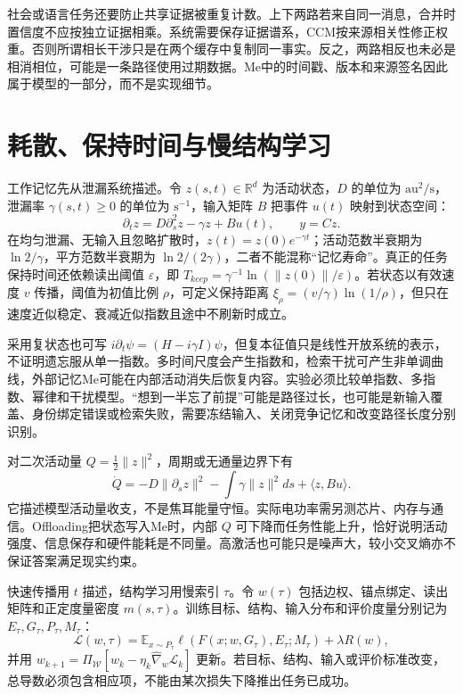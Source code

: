 社会或语言任务还要防止共享证据被重复计数。上下两路若来自同一消息，合并时置信度不应按独立证据相乘。系统需要保存证据谱系，CCM按来源相关性修正权重。否则所谓相长干涉只是在两个缓存中复制同一事实。反之，两路相反也未必是相消相位，可能是一条路径使用过期数据。Me中的时间戳、版本和来源签名因此属于模型的一部分，而不是实现细节。

\section{耗散、保持时间与慢结构学习}
\label{sec:dissipation_complex_spectrum}
\label{sec:dissipative_heat_and_plastic_collapse}

工作记忆先从泄漏系统描述。令 $z(s,t)\in\mathbb R^d$ 为活动状态，$D$ 的单位为 $\mathrm{au}^2/\mathrm{s}$，泄漏率 $\gamma(s,t)\ge0$ 的单位为 $\mathrm{s}^{-1}$，输入矩阵 $B$ 把事件 $u(t)$ 映射到状态空间：
\begin{equation}
 \partial_tz=D\partial_s^2z-\gamma z+Bu(t),\qquad y=Cz .
\end{equation}
在均匀泄漏、无输入且忽略扩散时，$z(t)=z(0)e^{-\gamma t}$；活动范数半衰期为 $\ln2/\gamma$，平方范数半衰期为 $\ln2/(2\gamma)$，二者不能混称“记忆寿命”。真正的任务保持时间还依赖读出阈值 $\varepsilon$，即 $T_{keep}=\gamma^{-1}\ln(\|z(0)\|/\varepsilon)$。若状态以有效速度 $v$ 传播，阈值为初值比例 $\rho$，可定义保持距离 $\xi_\rho=(v/\gamma)\ln(1/\rho)$，但只在速度近似稳定、衰减近似指数且途中不刷新时成立。

采用复状态也可写 $i\partial_t\psi=(H-i\gamma I)\psi$，但复本征值只是线性开放系统的表示，不证明遗忘服从单一指数。多时间尺度会产生指数和，检索干扰可产生非单调曲线，外部记忆Me可能在内部活动消失后恢复内容。实验必须比较单指数、多指数、幂律和干扰模型。“想到一半忘了前提”可能是路径过长，也可能是新输入覆盖、身份绑定错误或检索失败，需要冻结输入、关闭竞争记忆和改变路径长度分别识别。

对二次活动量 $Q=\tfrac12\|z\|^2$，周期或无通量边界下有
\begin{equation}
 \dot Q=-D\|\partial_sz\|^2-\int\gamma\|z\|^2ds+\langle z,Bu\rangle .
\end{equation}
它描述模型活动量收支，不是焦耳能量守恒。实际电功率需另测芯片、内存与通信。Offloading把状态写入Me时，内部 $Q$ 可下降而任务性能上升，恰好说明活动强度、信息保存和硬件能耗是不同量。高激活也可能只是噪声大，较小交叉熵亦不保证答案满足现实约束。

快速传播用 $t$ 描述，结构学习用慢索引 $\tau$。令 $w(\tau)$ 包括边权、锚点绑定、读出矩阵和正定度量密度 $m(s,\tau)$。训练目标、结构、输入分布和评价度量分别记为 $E_\tau,G_\tau,P_\tau,M_\tau$：
\begin{equation}
 \mathcal L(w,\tau)=\mathbb E_{x\sim P_\tau}\ell(F(x;w,G_\tau),E_\tau;M_\tau)+\lambda R(w),
\end{equation}
并用 $w_{k+1}=\Pi_{\mathcal W}[w_k-\eta_k\widehat\nabla_w\mathcal L_k]$ 更新。若目标、结构、输入或评价标准改变，总导数必须包含相应项，不能由某次损失下降推出任务已成功。

